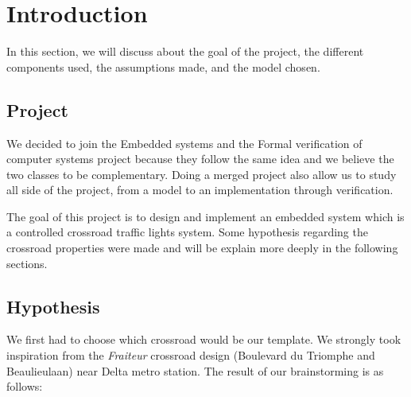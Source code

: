 \section{Introduction}
In this section, we will discuss about the goal of the project, the different components used, the assumptions made, and the model chosen.

\subsection{Project}

We decided to join the Embedded systems and the Formal verification of computer systems project because they follow the same idea and we believe the two classes to be complementary. Doing a merged project also allow us to study all side of the project, from a model to an implementation through verification.

The goal of this project is to design and implement an embedded system which is a controlled crossroad traffic lights system. Some hypothesis regarding the crossroad properties were made and will be explain more deeply in the following sections.

\subsection{Hypothesis}

We first had to choose which crossroad would be our template. We strongly took inspiration from the \textit{Fraiteur} crossroad design (Boulevard du Triomphe and Beaulieulaan) near Delta metro station. The result of our brainstorming is as follows:

